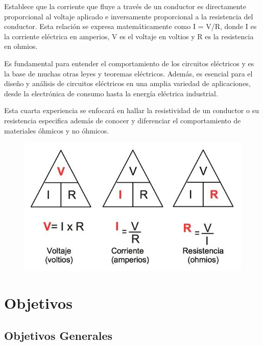 \documentclass[letterpaper, 12pt]{report}
\begin{document}
Establece que la corriente que fluye a través de un conductor
es directamente proporcional al voltaje aplicado e inversamente proporcional
a la resistencia del conductor. Esta relación se expresa matemáticamente como
I = V/R, donde I es la corriente eléctrica en amperios, V es el voltaje
en voltios y R es la resistencia en ohmios.

\bigskip

Es fundamental para entender el comportamiento de los circuitos
eléctricos y es la base de muchas otras leyes y teoremas eléctricos.
Además, es esencial para el diseño y análisis de circuitos eléctricos
en una amplia variedad de aplicaciones, desde la electrónica de consumo
hasta la energía eléctrica industrial.

\bigskip

Esta cuarta experiencia se enfocará en hallar la resistividad de un conductor
o su resistencia especifica además de conocer y diferenciar el comportamiento
de materiales óhmicos y no óhmicos.

\begin{figure}[H]
	\begin{center}
		\includegraphics[scale = 0.5]{./Images/LeyDeOhm.jpg}
	\end{center}
\end{figure}

\newpage

\section{Objetivos}

\subsection{Objetivos Generales}
\end{document}
